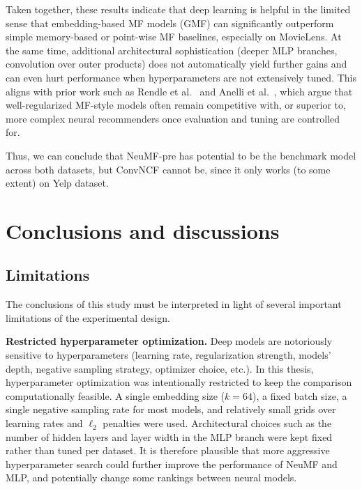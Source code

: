 \documentclass[11pt]{article}
\begin{document}
Taken together, these results indicate that deep learning is helpful in the limited sense that embedding-based MF models (GMF) can significantly outperform simple memory-based or point-wise MF baselines, especially on MovieLens. At the same time, additional architectural sophistication (deeper MLP branches, convolution over outer products) does not automatically yield further gains and can even hurt performance when hyperparameters are not extensively tuned. This aligns with prior work such as Rendle et al.~\cite{rendle2020neural} and Anelli et al.~\cite{anelli2021reenvisioning}, which argue that well-regularized MF-style models often remain competitive with, or superior to, more complex neural recommenders once evaluation and tuning are controlled for. 

Thus, we can conclude that NeuMF-pre has potential to be the benchmark model across both datasets, but ConvNCF cannot be, since it only works (to some extent) on Yelp dataset.




























  
\section{Conclusions and discussions}

\subsection{Limitations}

The conclusions of this study must be interpreted in light of several important limitations of the experimental design.

\textbf{Restricted hyperparameter optimization.}  
    Deep models are notoriously sensitive to hyperparameters (learning rate, regularization strength, models' depth, negative sampling strategy, optimizer choice, etc.). In this thesis, hyperparameter optimization was intentionally restricted to keep the comparison computationally feasible. A single embedding size ($k=64$), a fixed batch size, a single negative sampling rate for most models, and relatively small grids over learning rates and $\ell_2$ penalties were used. Architectural choices such as the number of hidden layers and layer width in the MLP branch were kept fixed rather than tuned per dataset. It is therefore plausible that more aggressive hyperparameter search could further improve the performance of NeuMF and MLP, and potentially change some rankings between neural models.
\end{document}
